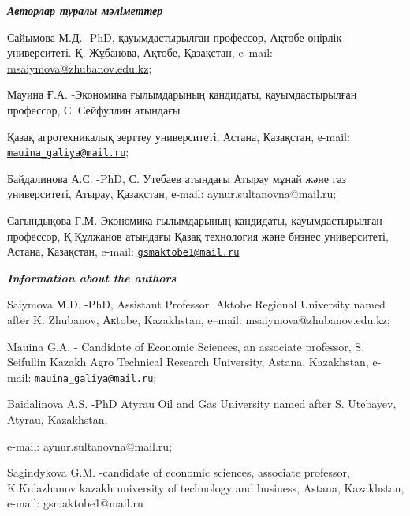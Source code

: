 \emph{{\bfseries Авторлар туралы мәліметтер}}

Сайымова М.Д. -PhD, қауымдастырылған профессор, Ақтөбе өңірлік
университеті. Қ. Жұбанова, Ақтөбе, Қазақстан, e--mail:
\href{mailto:77mika-07@mail.ru}{msaiymova@zhubanov.edu.kz};

Мауина Ғ.А. -Экономика ғылымдарының кандидаты, қауымдастырылған
профессор, С. Сейфуллин атындағы

Қазақ агротехникалық зерттеу университеті, Астана, Қазақстан, е-mail:
\href{mailto:mauina_galiya@mail.ru}{\nolinkurl{mauina\_galiya@mail.ru}};

Байдалинова А.С. -PhD, С. Утебаев атындағы Атырау мұнай және газ
университеті, Атырау, Қазақстан, е-mail: aynur.sultanovna@mail.ru;

Сағындықова Г.М.-Экономика ғылымдарының кандидаты, қауымдастырылған
профессор, Қ.Құлжанов атындағы Қазақ технология және бизнес
университеті, Астана, Қазақстан, e-mail:
\href{mailto:gsmaktobe1@mail.ru}{\nolinkurl{gsmaktobe1@mail.ru}}

\emph{{\bfseries Information about the authors}}

Saiymova М.D. -PhD, Assistant Professor, Aktobe Regional University
named after K. Zhubanov, Акtobe, Kazakhstan, e--mail:
msaiymova@zhubanov.edu.kz;

Mauina G.A. - Candidate of Economic Sciences, an associate professor, S.
Seifullin Kazakh Agro Technical Research University, Astana, Kazakhstan,
e-mail:
\href{mailto:mauina_galiya@mail.ru}{\nolinkurl{mauina\_galiya@mail.ru}};

Baidalinova A.S. -PhD Atyrau Oil and Gas University named after S.
Utebayev, Atyrau, Kazakhstan,

e-mail: aynur.sultanovna@mail.ru;

Sagindykova G.M. -candidate of economic sciences, associate professor,
K.Kulazhanov kazakh university of technology and business, Astana,
Kazakhstan, e-mail: gsmaktobe1@mail.ru